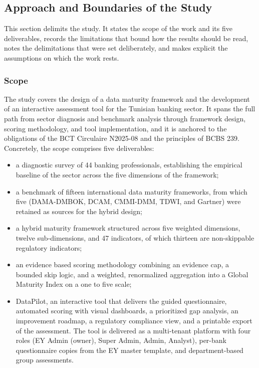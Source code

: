 \subsection{Approach and Boundaries of the Study}

This section delimits the study. It states the scope of the work and its five deliverables, records the limitations that bound how the results should be read, notes the delimitations that were set deliberately, and makes explicit the assumptions on which the work rests.

\subsubsection{Scope}

The study covers the design of a data maturity framework and the development of an interactive assessment tool for the Tunisian banking sector. It spans the full path from sector diagnosis and benchmark analysis through framework design, scoring methodology, and tool implementation, and it is anchored to the obligations of the BCT Circulaire N\textdegree{}2025-08 and the principles of BCBS 239. Concretely, the scope comprises five deliverables:

\begin{itemize}[leftmargin=*]
    \item a diagnostic survey of 44 banking professionals, establishing the empirical baseline of the sector across the five dimensions of the framework;
    \item a benchmark of fifteen international data maturity frameworks, from which five (DAMA-DMBOK, DCAM, CMMI-DMM, TDWI, and Gartner) were retained as sources for the hybrid design;
    \item a hybrid maturity framework structured across five weighted dimensions, twelve sub-dimensions, and 47 indicators, of which thirteen are non-skippable regulatory indicators;
    \item an evidence based scoring methodology combining an evidence cap, a bounded skip logic, and a weighted, renormalized aggregation into a Global Maturity Index on a one to five scale;
    \item DataPilot, an interactive tool that delivers the guided questionnaire, automated scoring with visual dashboards, a prioritized gap analysis, an improvement roadmap, a regulatory compliance view, and a printable export of the assessment. The tool is delivered as a multi-tenant platform with four roles (EY Admin (owner), Super Admin, Admin, Analyst), per-bank questionnaire copies from the EY master template, and department-based group assessments.
\end{itemize}

